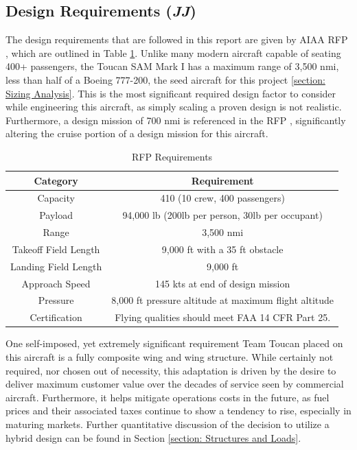 \subsection{Design Requirements (\textit{JJ})}
The design requirements that are followed in this report are given by AIAA RFP \cite{RFP}, which are outlined in Table \ref{uno}.  Unlike many modern aircraft capable of seating 400+ passengers, the Toucan SAM Mark I has a maximum range of 3,500 nmi, less than half of a Boeing 777-200, the seed aircraft for this project \ref{section: Sizing Analysis}.  This is the most significant required design factor to consider while engineering this aircraft, as simply scaling a proven design is not realistic.  Furthermore, a design mission of 700 nmi is referenced in the RFP \cite{RFP}, significantly altering the cruise portion of a design mission for this aircraft.  

\begin{table}[h!] 
    \centering
    \caption{RFP Requirements}
    \begin{tabular}{ |c||c| }\toprule
    \textbf{Category} & \textbf{Requirement} \\\hline\hline
    Capacity & 410 (10 crew, 400 passengers) \\\hline
    Payload & 94,000 lb (200lb per person, 30lb per occupant) \\\hline
    Range & 3,500 nmi \\\hline
    Takeoff Field Length & 9,000 ft with a 35 ft obstacle \\\hline
    Landing Field Length & 9,000 ft \\\hline
    Approach Speed & 145 kts at end of design mission\\\hline
    Pressure & 8,000 ft pressure altitude at maximum flight altitude \\\hline
    Certification & Flying qualities should meet FAA 14 CFR Part 25.\\\hline 

    \end{tabular}\label{uno}
\end{table}
\clearpage
One self-imposed, yet extremely significant requirement Team Toucan placed on this aircraft is a fully composite wing and wing structure. While certainly not required, nor chosen out of necessity, this adaptation is driven by the desire to deliver maximum customer value over the decades of service seen by commercial aircraft.  Furthermore, it helps mitigate operations costs in the future, as fuel prices and their associated taxes continue to show a tendency to rise, especially in maturing markets.  Further quantitative discussion of the decision to utilize a hybrid design can be found in Section \ref{section: Structures and Loads}.


